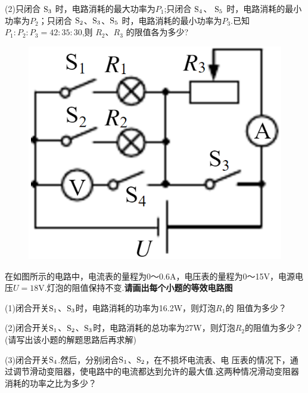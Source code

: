 \documentclass[11pt,a4paper]{article}
\newcommand{\nianfen}[1]{\hspace{-2em}{(#1\textbf{·}\textit{青岛})}}
\begin{document}
	(2)只闭合 $\rm S_3 $ 时，电路消耗的最大功率为$ P_1 $;只闭合 $\rm S_4$、 $\rm S_5 $ 时，电路消耗的最小功率为$ P_2 $；只闭合 $\rm S_2 $、$\rm S_3 $、$\rm S_5 $ 时，电路消耗的最小功率为$ P_3 $.已知 $ P_1:P_2:P_3=42:35:30 $,则 $ R_2 $、$ R_3 $ 的限值各为多少?
	\clearpage
	
	\begin{figure}
		\includegraphics[width=\linewidth]{2012}
	\end{figure}
	
	\nianfen{2012}在如图所示的电路中，电流表的量程为0～0.6A，电压表的量程为0～15V，电源电
	压$ U=18 $V.灯泡的阻值保持不变.\textbf{请画出每个小题的等效电路图}
	
	(1)闭合开关$\rm S_1 $、$\rm S_3 $时，电路消耗的功率为16.2W，则灯泡$ R_1 $的
	阻值为多少？ 
	
	(2)闭合开关$\rm S_1 $、$\rm S_2 $、$\rm S_3 $时，电路消耗的总功率为27W，则灯泡$ R_2 $的阻值为多少？(请写出该小题的解题思路后再求解) 
	
	(3)闭合开关$\rm S_4 $.然后，分别闭合$\rm S_1 $、$\rm S_2 $，在不损坏电流表、电
	压表的情况下，通过调节滑动变阻器，使电路中的电流都达到允许的最大值.这两种情况滑动变阻器消耗的功率之比为多少？
	\clearpage
	
\end{document}
